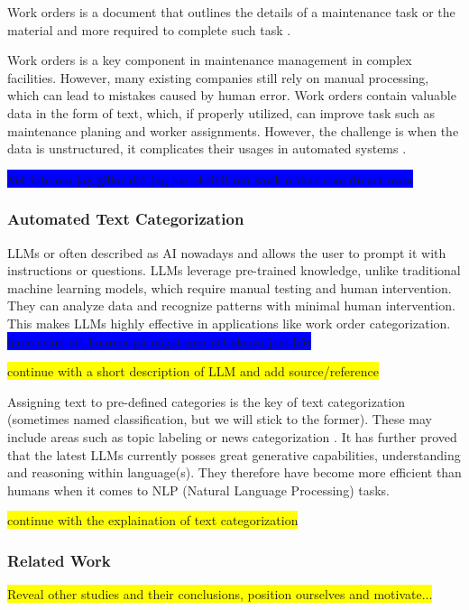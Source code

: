 \documentclass{article}
\begin{document}
Work orders is a document that outlines the details of a maintenance task or the material and more required
to complete such task \cite{ibm2023}.
\bigskip

Work orders is a key component in maintenance management in complex facilities. However, many existing companies
still rely on manual processing, which can lead to mistakes caused by human error. Work orders contain valuable
data in the form of text, which, if properly utilized, can improve task such as maintenance planing and worker assignments.
However, the challenge is when the data is unstructured, it complicates their usages in automated systems \cite{li et al.}.

\colorbox{blue}{Vet inte om jag gillar det jag har skrivit om work orders som du ser ovan}

\subsubsection{Automated Text Categorization}

LLMs or often described as AI nowadays and allows the user to prompt it with instructions or questions.
LLMs leverage pre-trained knowledge, unlike traditional machine learning models, which require
manual testing and human intervention. They can analyze data and recognize patterns with minimal 
human intervention. This makes LLMs highly effective in applications like work order categorization. 
\colorbox{blue}{hade svårt att komma på något mer att skriva just här}


\colorbox{yellow}{continue with a short description of LLM and add source/reference}

Assigning text to pre-defined categories is the key of text categorization
(sometimes named classification, but we will stick to the former).
These may include areas such as topic labeling or news categorization \cite{zhang2024}.
It has further proved that the latest LLMs currently posses great generative capabilities, understanding
and reasoning within language(s).
They therefore have become more efficient than humans when it comes to NLP (Natural Language Processing)
tasks.

\colorbox{yellow}{continue with the explaination of text categorization}

\subsubsection{Related Work}
\colorbox{yellow}{Reveal other studies and their conclusions, position ourselves and motivate...}
\end{document}
